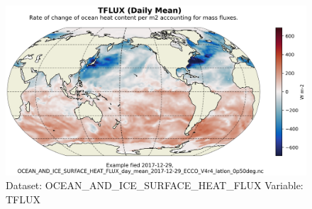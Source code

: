 \begin{figure}[H]
\centering
\includegraphics[scale=0.55]{../images/plots/latlon_plots/Ocean_and_Sea-Ice_Surface_Heat_Fluxes/TFLUX.png}
\caption{Dataset: OCEAN\_AND\_ICE\_SURFACE\_HEAT\_FLUX Variable: TFLUX}
\label{tab:table-OCEAN_AND_ICE_SURFACE_HEAT_FLUX_TFLUX-Plot}
\end{figure}
\pagebreak

